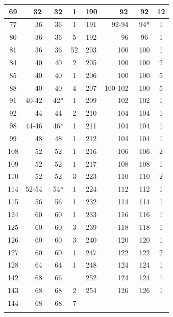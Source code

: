 \documentclass{article}
\theoremstyle{definition}
\theoremstyle{remark}
\begin{document}
\begin{table}[!htb]
\begin{tabular}{c|r|c|c|c|r|c|c}
\hline
69 & 32~\cite{Li2025} & 32 & 1 & 190 & 92~\cite{Li2025} & 92 & 12\\
\hline
77 & 36~\cite{Li2025} & 36 & 1 & 191 & 92-94~\cite{Li2025} & 94* & 1\\
\hline
80 & 36~\cite{Li2025} & 36 & 5 & 192 & 96~\cite{Li2025} & 96 & 1\\
\hline
81 & 36~\cite{Li2025} & 36 & 52 & 203 & 100~\cite{Li2025} & 100 & 1\\
\hline
84 & 40~\cite{Li2025} & 40 & 2 & 205 & 100~\cite{Li2025} & 100 & 2\\
\hline
85 & 40~\cite{Li2025} & 40 & 1 & 206 & 100~\cite{Li2025} & 100 & 5\\
\hline
88 & 40~\cite{Li2025} & 40 & 4 & 207 & 100-102~\cite{Li2025} & 100 & 5\\
\hline
91 & 40-42~\cite{Li2025} & 42* & 1 & 209 & 102~\cite{Li2025} & 102 & 1\\
\hline
92 & 44~\cite{Li2025} & 44 & 2 & 210 & 104~\cite{Li2025} & 104 & 1\\
\hline
98 & 44-46~\cite{Li2025} & 46* & 1 & 211 & 104~\cite{Li2025} & 104 & 1\\
\hline
99 & 48~\cite{Li2025} & 48 & 1 & 212 & 104~\cite{Li2025} & 104 & 1\\
\hline
108 & 52~\cite{Li2025} & 52 & 1 & 216 & 106~\cite{Li2025} & 106 & 2\\
\hline
109 & 52~\cite{Li2025} & 52 & 1 & 217 & 108~\cite{Li2025} & 108 & 1\\
\hline
110 & 52~\cite{Li2025} & 52 & 3 & 223 & 110~\cite{Li2025} & 110 & 2\\
\hline
114 & 52-54~\cite{Li2025} & 54* & 1 & 224 & 112~\cite{Li2025} & 112 & 1\\
\hline
115 & 56~\cite{Li2025} & 56 & 1 & 232 & 114~\cite{Li2025} & 114 & 1\\
\hline
124 & 60~\cite{Li2025} & 60 & 1 & 233 & 116~\cite{Li2025} & 116 & 1\\
\hline
125 & 60~\cite{Li2025} & 60 & 3 & 239 & 118~\cite{Li2025} & 118 & 1\\
\hline
126 & 60~\cite{Li2025} & 60 & 3 & 240 & 120~\cite{Li2025} & 120 & 1\\
\hline
127 & 60~\cite{Li2025} & 60 & 1 & 247 & 122~\cite{Li2025} & 122 & 2\\
\hline
128 & 64~\cite{Li2025} & 64 & 1 & 248 & 124~\cite{Li2025} & 124 & 1\\
\hline
142 & 68~\cite{Li2025} & 66 & & 252 & 124~\cite{Li2025} & 124 & 1\\
\hline
143 & 68~\cite{Li2025} & 68 & 2 & 254 & 126~\cite{Li2025} & 126 & 1\\
\hline
144 & 68~\cite{Li2025} & 68 & 7 &  &  &  & \\
\Xhline{2\arrayrulewidth}
\end{tabular}
\end{table}
\end{document}
